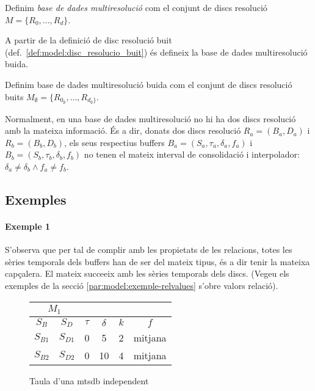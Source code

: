 \begin{definition}
  Definim \emph{base de dades multiresolució} com el conjunt de discs resolució
  $M=\{R_0,\dotsc,R_d\}$.
\end{definition}

A partir de la definició de disc resolució buit (def.~\ref{def:model:disc_resolucio_buit}) és defineix la base de dades multiresolució buida. 
 
\begin{definition}\label{def:model:bd_multiresolucio_buit}
  Definim base de dades multiresolució buida com el conjunt de discs
  resolució buits
  $M_{\emptyset}=\{R_{0_{\emptyset}},\dotsc,R_{d_{\emptyset}\}}$.
\end{definition}

Normalment, en una base de dades multiresolució no hi ha dos discs
resolució amb la mateixa informació. És a dir, donats dos discs
resolució $R_a = (B_a, D_a)$ i $R_b = (B_b, D_b)$, 
els seus respectius buffers 
$B_a=(S_a,\tau_a,\delta_a,f_a)$ i
$B_b=(S_b,\tau_b,\delta_b,f_b)$ no tenen el mateix interval de
consolidació i interpolador: 
$\delta_a \neq \delta_b \wedge f_a \neq f_b$.









\subsection{Exemples}

\paragraph{Exemple 1}


S'observa que per tal de complir amb les propietats de les relacions, totes les sèries temporals dels buffers han de ser del mateix tipus, és a dir tenir la mateixa capçalera. El mateix succeeix amb les sèries temporals dels discs. (Vegeu els exemples de la secció \ref{par:model:exemple-relvalues} s'obre valors relació).

\begin{figure}[tp]
  \centering
  \begin{tabular}{|c|c|c|c|c|c|}
    \multicolumn{2}{c}{$M_1$} \\ \hline
    $S_B$  & $S_D$ & $\tau$ & $\delta$ & $k$ & $f$ \\ \hline
    $S_{B1}$ & $S_{D1}$ & 0 & 5  & 2 & mitjana  \\
    $S_{B2}$ & $S_{D2}$ & 0 & 10 & 4 & mitjana  \\ \hline
  \end{tabular}
  \caption{Taula d'una mtsdb independent}
  \label{fig:model:mtsdb:independent}
\end{figure}



